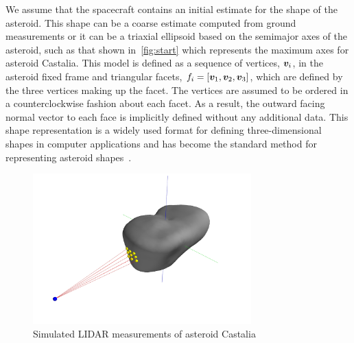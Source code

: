 \documentclass[letterpaper, paper,11pt]{AAS}		%
\begin{document}
We assume that the spacecraft contains an initial estimate for the shape of the asteroid.
This shape can be a coarse estimate computed from ground measurements or it can be a triaxial ellipsoid based on the semimajor axes of the asteroid, such as that shown in~\cref{fig:start} which represents the maximum axes for asteroid Castalia.
This model is defined as a sequence of vertices, \( \bm{v}_i\), in the asteroid fixed frame and triangular facets, \( f_i = \left[ \bm{v}_1, \bm{v}_2, \bm{v}_3 \right]\), which are defined by the three vertices making up the facet.
The vertices are assumed to be ordered in a counterclockwise fashion about each facet. 
As a result, the outward facing normal vector to each face is implicitly defined without any additional data.
This shape representation is a widely used format for defining three-dimensional shapes in computer applications and has become the standard method for representing asteroid shapes~\cite{neese2004}.
\begin{figure}
    \centering
    \includegraphics[width=0.75\textwidth]{figures/castalia_raycasting_plot.jpg}
    \caption{Simulated LIDAR measurements of asteroid Castalia~\label{fig:lidar_example}}
\end{figure}
\end{document}
